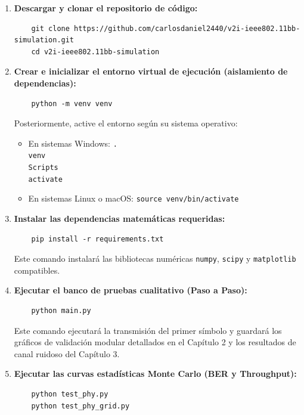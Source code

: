 \begin{enumerate}
    \item \textbf{Descargar y clonar el repositorio de código:}
    \begin{verbatim}
    git clone https://github.com/carlosdaniel2440/v2i-ieee802.11bb-simulation.git
    cd v2i-ieee802.11bb-simulation
    \end{verbatim}
    
    \item \textbf{Crear e inicializar el entorno virtual de ejecución (aislamiento de dependencias):}
    \begin{verbatim}
    python -m venv venv
    \end{verbatim}
    Posteriormente, active el entorno según su sistema operativo:
    \begin{itemize}
        \item En sistemas Windows: \texttt{.\\venv\\Scripts\\activate}
        \item En sistemas Linux o macOS: \texttt{source venv/bin/activate}
    \end{itemize}
    
    \item \textbf{Instalar las dependencias matemáticas requeridas:}
    \begin{verbatim}
    pip install -r requirements.txt
    \end{verbatim}
    Este comando instalará las bibliotecas numéricas \texttt{numpy}, \texttt{scipy} y \texttt{matplotlib} compatibles.
    
    \item \textbf{Ejecutar el banco de pruebas cualitativo (Paso a Paso):}
    \begin{verbatim}
    python main.py
    \end{verbatim}
    Este comando ejecutará la transmisión del primer símbolo y guardará los gráficos de validación modular detallados en el Capítulo 2 y los resultados de canal ruidoso del Capítulo 3.
    
    \item \textbf{Ejecutar las curvas estadísticas Monte Carlo (BER y Throughput):}
    \begin{verbatim}
    python test_phy.py
    python test_phy_grid.py
    \end{verbatim}
\end{enumerate}


